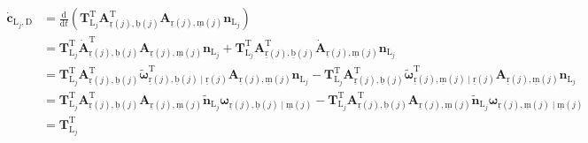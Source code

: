 \[
\begin{aligned}
\dot{\boldsymbol{c}}_{\mathrm{L}_{j}, \mathrm{D}}
& = \frac{\mathrm{d}}{\mathrm{d}t}
   \left( \boldsymbol{T}_{\mathrm{L}_{j}}^{\mathrm{T}}
          \boldsymbol{A}_{\underline{\mathrm{r}}(j), \underline{\mathrm{b}}(j)}^{\mathrm{T}}
          \boldsymbol{A}_{\underline{\mathrm{r}}(j), \underline{\mathrm{m}}(j)}
          \boldsymbol{n}_{\mathrm{L}_{j}} \right) \\
& = \boldsymbol{T}_{\mathrm{L}_{j}}^{\mathrm{T}}
    \dot{\boldsymbol{A}}_{\underline{\mathrm{r}}(j), \underline{\mathrm{b}}(j)}^{\mathrm{T}}
    \boldsymbol{A}_{\underline{\mathrm{r}}(j), \underline{\mathrm{m}}(j)}
    \boldsymbol{n}_{\mathrm{L}_{j}}
  + \boldsymbol{T}_{\mathrm{L}_{j}}^{\mathrm{T}}
    \boldsymbol{A}_{\underline{\mathrm{r}}(j), \underline{\mathrm{b}}(j)}^{\mathrm{T}}
    \dot{\boldsymbol{A}}_{\underline{\mathrm{r}}(j), \underline{\mathrm{m}}(j)}
    \boldsymbol{n}_{\mathrm{L}_{j}} \\
& = \boldsymbol{T}_{\mathrm{L}_{j}}^{\mathrm{T}}
    \boldsymbol{A}_{\underline{\mathrm{r}}(j), \underline{\mathrm{b}}(j)}^{\mathrm{T}}
    \tilde{\boldsymbol{\omega}}_{\underline{\mathrm{r}}(j), \underline{\mathrm{b}}(j) \mid \underline{\mathrm{r}}(j)}^{\mathrm{T}}
    \boldsymbol{A}_{\underline{\mathrm{r}}(j), \underline{\mathrm{m}}(j)}
    \boldsymbol{n}_{\mathrm{L}_{j}}
  - \boldsymbol{T}_{\mathrm{L}_{j}}^{\mathrm{T}}
    \boldsymbol{A}_{\underline{\mathrm{r}}(j), \underline{\mathrm{b}}(j)}^{\mathrm{T}}
    \tilde{\boldsymbol{\omega}}_{\underline{\mathrm{r}}(j), \underline{\mathrm{m}}(j) \mid \underline{\mathrm{r}}(j)}^{\mathrm{T}}
    \boldsymbol{A}_{\underline{\mathrm{r}}(j), \underline{\mathrm{m}}(j)}
    \boldsymbol{n}_{\mathrm{L}_{j}} \\
& = \boldsymbol{T}_{\mathrm{L}_{j}}^{\mathrm{T}}
    \boldsymbol{A}_{\underline{\mathrm{r}}(j), \underline{\mathrm{b}}(j)}^{\mathrm{T}}
    \boldsymbol{A}_{\underline{\mathrm{r}}(j), \underline{\mathrm{m}}(j)}
    \tilde{\boldsymbol{n}}_{\mathrm{L}_{j}}
    \boldsymbol{\omega}_{\underline{\mathrm{r}}(j), \underline{\mathrm{b}}(j) \mid \underline{\mathrm{m}}(j)}
  - \boldsymbol{T}_{\mathrm{L}_{j}}^{\mathrm{T}}
    \boldsymbol{A}_{\underline{\mathrm{r}}(j), \underline{\mathrm{b}}(j)}^{\mathrm{T}}
    \boldsymbol{A}_{\underline{\mathrm{r}}(j), \underline{\mathrm{m}}(j)}
    \tilde{\boldsymbol{n}}_{\mathrm{L}_{j}}
    \boldsymbol{\omega}_{\underline{\mathrm{r}}(j), \underline{\mathrm{m}}(j) \mid \underline{\mathrm{m}}(j)} \\
& = \boldsymbol{T}_{\mathrm{L}_{j}}^{\mathrm{T}}

\end{aligned}\]
